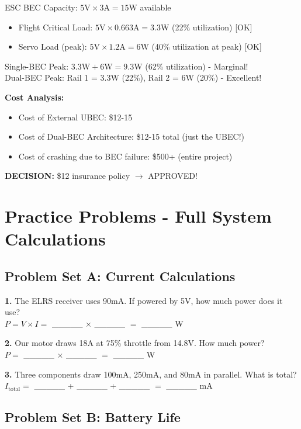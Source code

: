 \documentclass[11pt,letterpaper]{article}
\begin{document}
ESC BEC Capacity: $5\text{V} \times 3\text{A} = 15\text{W}$ available

\begin{itemize}
  \item Flight Critical Load: $5\text{V} \times 0.663\text{A} = 3.3\text{W}$ (22\% utilization) [OK]
  \item Servo Load (peak): $5\text{V} \times 1.2\text{A} = 6\text{W}$ (40\% utilization at peak) [OK]
\end{itemize}

Single-BEC Peak: $3.3\text{W} + 6\text{W} = 9.3\text{W}$ (62\% utilization) - Marginal!\\
Dual-BEC Peak: Rail 1 = 3.3W (22\%), Rail 2 = 6W (20\%) - Excellent!

\textbf{Cost Analysis:}
\begin{itemize}
  \item Cost of External UBEC: \$12-15
  \item Cost of Dual-BEC Architecture: \$12-15 total (just the UBEC!)
  \item Cost of crashing due to BEC failure: \$500+ (entire project)
\end{itemize}

\textbf{DECISION:} \$12 insurance policy $\rightarrow$ APPROVED!

\section{Practice Problems - Full System Calculations}

\subsection{Problem Set A: Current Calculations}

\textbf{1.} The ELRS receiver uses 90mA. If powered by 5V, how much power does it use?\\
$P = V \times I = $ \_\_\_\_\_ $\times$ \_\_\_\_\_ $= $ \_\_\_\_\_ W

\textbf{2.} Our motor draws 18A at 75\% throttle from 14.8V. How much power?\\
$P = $ \_\_\_\_\_ $\times$ \_\_\_\_\_ $= $ \_\_\_\_\_ W

\textbf{3.} Three components draw 100mA, 250mA, and 80mA in parallel. What is total?\\
$I_{\text{total}} = $ \_\_\_\_\_ + \_\_\_\_\_ + \_\_\_\_\_ $= $ \_\_\_\_\_ mA

\subsection{Problem Set B: Battery Life}
\end{document}
